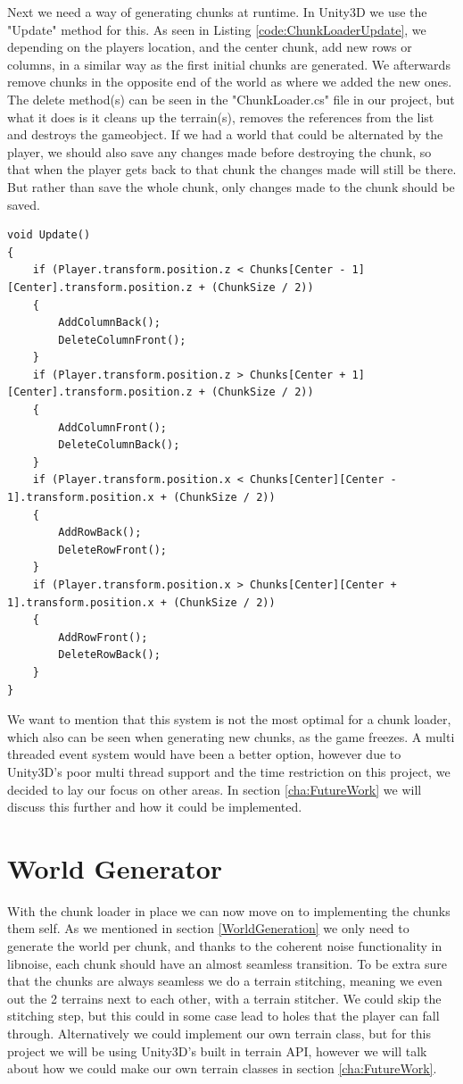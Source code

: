 Next we need a way of generating chunks at runtime. In Unity3D we use the "Update" method for this. As seen in Listing \ref{code:ChunkLoaderUpdate}, we depending on the players location, and the center chunk, add new rows or columns, in a similar way as the first initial chunks are generated. We afterwards remove chunks in the opposite end of the world as where we added the new ones. The delete method(s) can be seen in the "ChunkLoader.cs" file in our project, but what it does is it cleans up the terrain(s), removes the references from the list and destroys the gameobject. If we had a world that could be alternated by the player, we should also save any changes made before destroying the chunk, so that when the player gets back to that chunk the changes made will still be there. But rather than save the whole chunk, only changes made to the chunk should be saved.

\begin{lstlisting}[caption = The Update() method used to generate new chunks., label=code:ChunkLoaderUpdate, language=Csharp]
void Update()
{
	if (Player.transform.position.z < Chunks[Center - 1][Center].transform.position.z + (ChunkSize / 2))
	{
		AddColumnBack();
		DeleteColumnFront();
	}
	if (Player.transform.position.z > Chunks[Center + 1][Center].transform.position.z + (ChunkSize / 2))
	{
		AddColumnFront();
		DeleteColumnBack();
	}
	if (Player.transform.position.x < Chunks[Center][Center - 1].transform.position.x + (ChunkSize / 2))
	{
		AddRowBack();
		DeleteRowFront();
	}
	if (Player.transform.position.x > Chunks[Center][Center + 1].transform.position.x + (ChunkSize / 2))
	{
		AddRowFront();
		DeleteRowBack();
	}
}
\end{lstlisting}

We want to mention that this system is not the most optimal for a chunk loader, which also can be seen when generating new chunks, as the game freezes. A multi threaded event system would have been a better option, however due to Unity3D's poor multi thread support and the time restriction on this project, we decided to lay our focus on other areas. In section \ref{cha:FutureWork} we will discuss this further and how it could be implemented.


\section{World Generator}
\label{WorldGenerator}

With the chunk loader in place we can now move on to implementing the chunks them self. As we mentioned in section \ref{WorldGeneration} we only need to generate the world per chunk, and thanks to the coherent noise functionality in libnoise, each chunk should have an almost seamless transition. To be extra sure that the chunks are always seamless we do a terrain stitching, meaning we even out the 2 terrains next to each other, with a terrain stitcher. We could skip the stitching step, but this could in some case lead to holes that the player can fall through. Alternatively we could implement our own terrain class, but for this project we will be using Unity3D's built in terrain API, however we will talk about how we could make our own terrain classes in section \ref{cha:FutureWork}.


